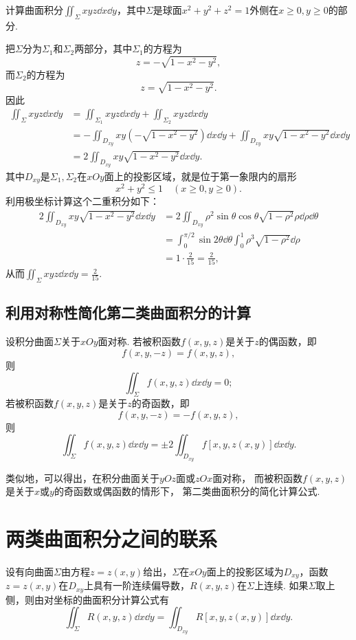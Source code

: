 \begin{example}
计算曲面积分\(\iint_{\Sigma} xyz \dd{x}\dd{y}\)，其中\(\Sigma\)是球面\(x^2+y^2+z^2=1\)外侧在\(x\geq0,y\geq0\)的部分.
\begin{solution}
把\(\Sigma\)分为\(\Sigma_1\)和\(\Sigma_2\)两部分，其中\(\Sigma_1\)的方程为\[
z = -\sqrt{1-x^2-y^2},
\]而\(\Sigma_2\)的方程为\[
z = \sqrt{1-x^2-y^2}.
\]因此\begin{align*}
\iint_{\Sigma} xyz \dd{x}\dd{y}
&= \iint_{\Sigma_1} xyz \dd{x}\dd{y}
+ \iint_{\Sigma_2} xyz \dd{x}\dd{y} \\
&= -\iint_{D_{xy}} xy (-\sqrt{1-x^2-y^2}) \dd{x}\dd{y}
+ \iint_{D_{xy}} xy \sqrt{1-x^2-y^2} \dd{x}\dd{y} \\
&= 2 \iint_{D_{xy}} xy \sqrt{1-x^2-y^2} \dd{x}\dd{y}.
\end{align*}
其中\(D_{xy}\)是\(\Sigma_1,\Sigma_2\)在\(xOy\)面上的投影区域，就是位于第一象限内的扇形\[
x^2+y^2\leq1 \quad(x\geq0,y\geq0).
\]利用极坐标计算这个二重积分如下：\begin{align*}
2 \iint_{D_{xy}} xy \sqrt{1-x^2-y^2} \dd{x}\dd{y}
&= 2 \iint_{D_{xy}} \rho^2 \sin\theta \cos\theta \sqrt{1-\rho^2} \rho\dd{\rho}\dd{\theta} \\
&= \int_0^{\pi/2} \sin2\theta \dd{\theta} \int_0^1 \rho^3 \sqrt{1-\rho^2} \dd{\rho} \\
&= 1 \cdot \frac{2}{15} = \frac{2}{15},
\end{align*}
从而\(\iint_{\Sigma} xyz \dd{x}\dd{y} = \frac{2}{15}\).
\end{solution}
\end{example}

\subsection{利用对称性简化第二类曲面积分的计算}
设积分曲面\(\Sigma\)关于\(xOy\)面对称.
若被积函数\(f(x,y,z)\)是关于\(z\)的偶函数，即\[
	f(x,y,-z) = f(x,y,z),
\]
则\[
	\iint_{\Sigma} f(x,y,z) \dd{x}\dd{y} = 0;
\]
若被积函数\(f(x,y,z)\)是关于\(z\)的奇函数，即\[
	f(x,y,-z) = -f(x,y,z),
\]
则\[
	\iint_{\Sigma} f(x,y,z) \dd{x}\dd{y} = \pm2 \iint_{D_{xy}} f[x,y,z(x,y)] \dd{x}\dd{y}.
\]

类似地，可以得出，在积分曲面关于\(yOz\)面或\(zOx\)面对称，
而被积函数\(f(x,y,z)\)是关于\(x\)或\(y\)的奇函数或偶函数的情形下，
第二类曲面积分的简化计算公式.

\section{两类曲面积分之间的联系}
设有向曲面\(\Sigma\)由方程\(z = z(x,y)\)给出，\(\Sigma\)在\(xOy\)面上的投影区域为\(D_{xy}\)，函数\(z = z(x,y)\)在\(D_{xy}\)上具有一阶连续偏导数，\(R(x,y,z)\)在\(\Sigma\)上连续.
如果\(\Sigma\)取上侧，则由对坐标的曲面积分计算公式有\[
\iint_{\Sigma} R(x,y,z) \dd{x}\dd{y} = \iint_{D_{xy}} R[x,y,z(x,y)] \dd{x}\dd{y}.
\]

